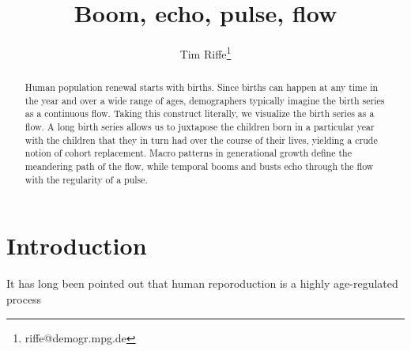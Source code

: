 \documentclass{article}
\begin{document}
\title{Boom, echo, pulse, flow}
\author[1]{Tim Riffe\thanks{riffe@demogr.mpg.de}}
\maketitle

\begin{abstract}
Human population renewal starts with births. Since births can happen at any
time in the year and over a wide range of ages, demographers typically imagine
the birth series as a continuous flow. Taking this construct literally, we
visualize the birth series as a flow. A long birth series allows us to
juxtapose the children born in a particular year with the children that
they in turn had over the course of their lives, yielding a crude notion of
cohort replacement. Macro patterns in generational growth define the meandering
path of the flow, while temporal booms and busts echo through the flow with the
regularity of a pulse.
\end{abstract}

\section{Introduction}
It has long been pointed out that human reporoduction is a highly age-regulated
process \citep[e.g.,][]{kuczynski1932fertility}

\FloatBarrier
\singlespacing

   
\end{document}
